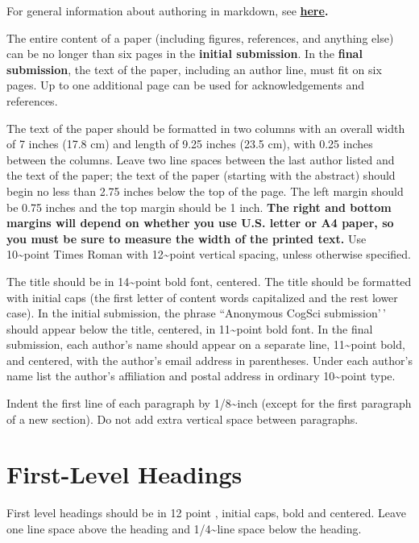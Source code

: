 \documentclass[10pt, letterpaper]{article}
\begin{document}
For general information about authoring in markdown, see
\textbf{\href{http://rmarkdown.rstudio.com/authoring_basics.html}{here}.}

The entire content of a paper (including figures, references, and
anything else) can be no longer than six pages in the
\textbf{initial submission}. In the \textbf{final submission}, the text
of the paper, including an author line, must fit on six pages. Up to one
additional page can be used for acknowledgements and references.

The text of the paper should be formatted in two columns with an overall
width of 7 inches (17.8 cm) and length of 9.25 inches (23.5 cm), with
0.25 inches between the columns. Leave two line spaces between the last
author listed and the text of the paper; the text of the paper (starting
with the abstract) should begin no less than 2.75 inches below the top
of the page. The left margin should be 0.75 inches and the top margin
should be 1 inch. \textbf{The right and bottom margins will depend on
whether you use U.S. letter or A4 paper, so you must be sure to
measure the width of the printed text.} Use 10\textasciitilde point
Times Roman with 12\textasciitilde point vertical spacing, unless
otherwise specified.

The title should be in 14\textasciitilde point bold font, centered. The
title should be formatted with initial caps (the first letter of content
words capitalized and the rest lower case). In the initial submission,
the phrase ``Anonymous CogSci submission'\,' should appear below the
title, centered, in 11\textasciitilde point bold font. In the final
submission, each author's name should appear on a separate line,
11\textasciitilde point bold, and centered, with the author's email
address in parentheses. Under each author's name list the author's
affiliation and postal address in ordinary 10\textasciitilde point type.

Indent the first line of each paragraph by 1/8\textasciitilde inch
(except for the first paragraph of a new section). Do not add extra
vertical space between paragraphs.

\hypertarget{first-level-headings}{%
\section{First-Level Headings}\label{first-level-headings}}

First level headings should be in 12 point , initial caps, bold and
centered. Leave one line space above the heading and
1/4\textasciitilde line space below the heading.
\end{document}
